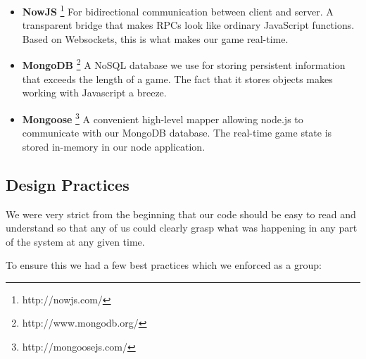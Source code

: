 \documentclass[a4wide, 11pt]{article}
\begin{document}
\begin{itemize}
  \item
    {\bf NowJS}
    \footnote{http://nowjs.com/}
    For bidirectional communication between client and server. A transparent bridge that makes RPCs look like ordinary JavaScript functions. Based on Websockets, this is what makes our game real-time.
  
  \item
    {\bf MongoDB}
    \footnote{http://www.mongodb.org/}
    A NoSQL database we use for storing persistent information that exceeds the length of a game. The fact that it stores objects makes working with Javascript a breeze.

  \item
    {\bf Mongoose}
    \footnote{http://mongoosejs.com/}
    A convenient high-level mapper allowing node.js to communicate with our MongoDB database. The real-time game state is stored in-memory in our node application.
\end{itemize}

\subsection{Design Practices}

We were very strict from the beginning that our code should be easy to read and understand so that any of us could clearly grasp what was happening in any part of the system at any given time.

To ensure this we had a few best practices which we enforced as a group:
\end{document}
